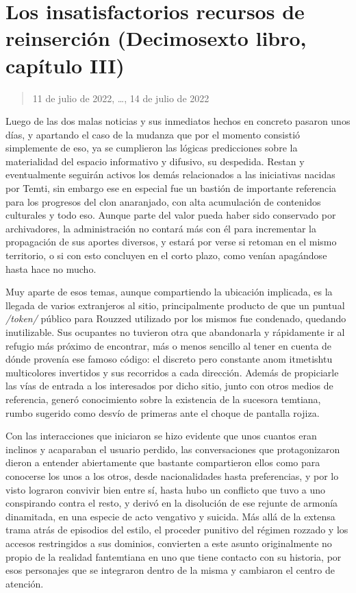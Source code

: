\documentclass[
]{book}
\begin{document}
\hypertarget{los-insatisfactorios-recursos-de-reinserciuxf3n-decimosexto-libro-capuxedtulo-iii}{%
\section{Los insatisfactorios recursos de reinserción (Decimosexto libro, capítulo III)}\label{los-insatisfactorios-recursos-de-reinserciuxf3n-decimosexto-libro-capuxedtulo-iii}}

\begin{quote}
11 de julio de 2022, \ldots, 14 de julio de 2022
\end{quote}

Luego de las dos malas noticias y sus inmediatos hechos en concreto pasaron unos días, y apartando el caso de la mudanza que por el momento consistió simplemente de eso, ya se cumplieron las lógicas predicciones sobre la materialidad del espacio informativo y difusivo, su despedida. Restan y eventualmente seguirán activos los demás relacionados a las iniciativas nacidas por Temti, sin embargo ese en especial fue un bastión de importante referencia para los progresos del clon anaranjado, con alta acumulación de contenidos culturales y todo eso. Aunque parte del valor pueda haber sido conservado por archivadores, la administración no contará más con él para incrementar la propagación de sus aportes diversos, y estará por verse si retoman en el mismo territorio, o si con esto concluyen en el corto plazo, como venían apagándose hasta hace no mucho.

Muy aparte de esos temas, aunque compartiendo la ubicación implicada, es la llegada de varios extranjeros al sitio, principalmente producto de que un puntual \emph{/token/} público para Rouzzed utilizado por los mismos fue condenado, quedando inutilizable. Sus ocupantes no tuvieron otra que abandonarla y rápidamente ir al refugio más próximo de encontrar, más o menos sencillo al tener en cuenta de dónde provenía ese famoso código: el discreto pero constante anom itmetishtu multicolores invertidos y sus recorridos a cada dirección. Además de propiciarle las vías de entrada a los interesados por dicho sitio, junto con otros medios de referencia, generó conocimiento sobre la existencia de la sucesora temtiana, rumbo sugerido como desvío de primeras ante el choque de pantalla rojiza.

Con las interacciones que iniciaron se hizo evidente que unos cuantos eran inclinos y acaparaban el usuario perdido, las conversaciones que protagonizaron dieron a entender abiertamente que bastante compartieron ellos como para conocerse los unos a los otros, desde nacionalidades hasta preferencias, y por lo visto lograron convivir bien entre sí, hasta hubo un conflicto que tuvo a uno conspirando contra el resto, y derivó en la disolución de ese rejunte de armonía dinamitada, en una especie de acto vengativo y suicida. Más allá de la extensa trama atrás de episodios del estilo, el proceder punitivo del régimen rozzado y los accesos restringidos a sus dominios, convierten a este asunto originalmente no propio de la realidad fantemtiana en uno que tiene contacto con su historia, por esos personajes que se integraron dentro de la misma y cambiaron el centro de atención.
\end{document}
